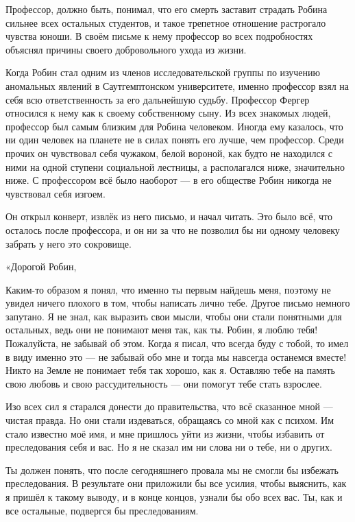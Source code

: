 \documentclass[a4paper,12pt]{book}
\begin{document}
\par
Профессор, должно быть, понимал, что его смерть заставит страдать Робина сильнее всех остальных студентов, и такое трепетное отношение растрогало чувства юноши. В своём письме к нему профессор во всех подробностях объяснял причины своего добровольного ухода из жизни.
\par
Когда Робин стал одним из членов исследовательской группы по изучению аномальных явлений в Саутгемптонском университете, именно профессор взял на себя всю ответственность за его дальнейшую судьбу. Профессор Фергер относился к нему как к своему собственному сыну. Из всех знакомых людей, профессор был самым близким для Робина человеком. Иногда ему казалось, что ни один человек на планете не в силах понять его лучше, чем профессор. Среди прочих он чувствовал себя чужаком, белой вороной, как будто не находился с ними на одной ступени социальной лестницы, а располагался ниже, значительно ниже. С профессором всё было наоборот — в его обществе Робин никогда не чувствовал себя изгоем.
\par
Он открыл конверт, извлёк из него письмо, и начал читать. Это было всё, что осталось после профессора, и он ни за что не позволил бы ни одному человеку забрать у него это сокровище.\\
\par
«Дорогой Робин,\\
\par
Каким-то образом я понял, что именно ты первым найдешь меня, поэтому не увидел ничего плохого в том, чтобы написать лично тебе. Другое письмо немного запутано. Я не знал, как выразить свои мысли, чтобы они стали понятными для остальных, ведь они не понимают меня так, как ты. Робин, я люблю тебя! Пожалуйста, не забывай об этом. Когда я писал, что всегда буду с тобой, то имел в виду именно это — не забывай обо мне и тогда мы навсегда останемся вместе! Никто на Земле не понимает тебя так хорошо, как я. Оставляю тебе на память свою любовь и свою рассудительность — они помогут тебе стать взрослее.
\par
Изо всех сил я старался донести до правительства, что всё сказанное мной — чистая правда. Но они стали издеваться, обращаясь со мной как с психом. Им стало известно моё имя, и мне пришлось уйти из жизни, чтобы избавить от преследования себя и вас. Но я не сказал им ни слова ни о тебе, ни о других.
\par
Ты должен понять, что после сегодняшнего провала мы не смогли бы избежать преследования. В результате они приложили бы все усилия, чтобы выяснить, как я пришёл к такому выводу, и в конце концов, узнали бы обо всех вас. Ты, как и все остальные, подвергся бы преследованиям.
\end{document}
